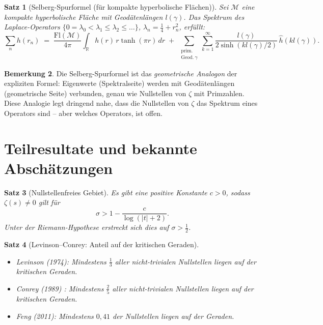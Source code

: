 \documentclass[12pt,a4paper]{amsart}
\newtheorem{theorem}{Satz}[section]
\theoremstyle{definition}
\newtheorem{remark}[theorem]{Bemerkung}
\newcommand{\R}{\mathbb{R}}
\begin{document}
\begin{theorem}[Selberg-Spurformel (f\"ur kompakte hyperbolische Fl\"achen)]
\label{thm:selberg_trace}
Sei $\mathcal{M}$ eine kompakte hyperbolische Fl\"ache mit Geod\"atenl\"angen
$l(\gamma)$. Das Spektrum des Laplace-Operators
$\{0 = \lambda_0 < \lambda_1 \le \lambda_2 \le \ldots\}$,
$\lambda_n = \tfrac{1}{4} + r_n^2$, erf\"ullt:
\[
  \sum_n h(r_n) \;=\; \frac{\text{Fl}(\mathcal{M})}{4\pi}
  \int_\R h(r)\,r\tanh(\pi r)\,dr
  \;+\; \sum_{\substack{\text{prim.}\\ \text{Geod.}\ \gamma}} \sum_{k=1}^\infty
  \frac{l(\gamma)}{2\sinh(k l(\gamma)/2)}\,\hat h(k l(\gamma)).
\]
\end{theorem}

\begin{remark}
Die Selberg-Spurformel ist das \emph{geometrische Analogon} der
expliziten Formel:
Eigenwerte (Spektralseite) werden mit Geod\"atenl\"angen (geometrische Seite)
verbunden, genau wie Nullstellen von $\zeta$ mit Primzahlen.
Diese Analogie legt dringend nahe, dass die Nullstellen von $\zeta$
das Spektrum eines Operators sind -- aber welches Operators, ist offen.
\end{remark}

\section{Teilresultate und bekannte Absch\"atzungen}

\begin{theorem}[Nullstellenfreies Gebiet]
\label{thm:zero_free}
Es gibt eine positive Konstante $c > 0$, sodass $\zeta(s) \ne 0$ gilt f\"ur
\[
  \sigma > 1 - \frac{c}{\log(|t|+2)}.
\]
Unter der Riemann-Hypothese erstreckt sich dies auf $\sigma > \tfrac{1}{2}$.
\end{theorem}

\begin{theorem}[Levinson--Conrey: Anteil auf der kritischen Geraden]
\label{thm:levinson_conrey}
\begin{itemize}
  \item Levinson (1974): Mindestens $\tfrac{1}{3}$ aller nicht-trivialen
    Nullstellen liegen auf der kritischen Geraden.
  \item Conrey (1989) \cite{Conrey1989}: Mindestens $\tfrac{2}{5}$ aller
    nicht-trivialen Nullstellen liegen auf der kritischen Geraden.
  \item Feng (2011): Mindestens $0{,}41$ der Nullstellen liegen auf der Geraden.
\end{itemize}
\end{theorem}
\end{document}
